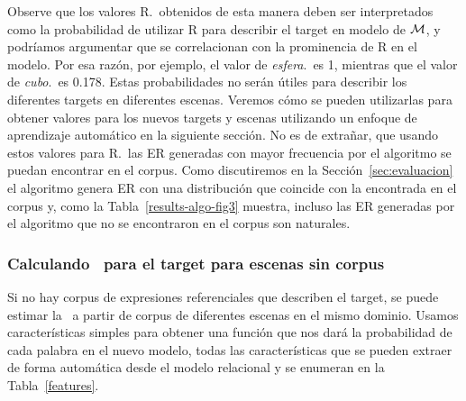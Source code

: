 Observe que los valores R.\puse\ obtenidos de esta manera deben ser
interpretados como la probabilidad de utilizar R para describir el target en
modelo de $\mathcal{M} $, y podr\'{i}amos argumentar que se correlacionan con la
 prominencia de R en el modelo. Por esa raz\'on, por ejemplo, el
valor de \emph{esfera}.\puse\ es 1, mientras que el valor de
\emph{cubo}.\puse\ es 0.178. Estas probabilidades no ser\'an \'utiles
para describir los diferentes targets en diferentes escenas. Veremos c\'omo se
pueden utilizarlas para obtener valores para los nuevos targets y escenas utilizando un
enfoque de aprendizaje autom\'atico en la siguiente secci\'on. No es de extra\~nar,
que usando estos valores para R.\puse\ las ER generadas con mayor frecuencia por el
algoritmo se puedan encontrar en el corpus. Como discutiremos en la Secci\'on~\ref{sec:evaluacion} el algoritmo genera ER
con una distribuci\'on que coincide con la encontrada en el corpus y, como la
Tabla~\ref{results-algo-fig3} muestra, incluso las ER generadas por el algoritmo que no se encontraron
en el corpus son naturales.


\subsubsection{Calculando \puse\ para el target para escenas sin corpus } 
\label{subsec:learning}

%

Si no hay corpus de expresiones referenciales que describen el target, se puede estimar la \puse~a partir de corpus de
diferentes escenas en el mismo dominio.
Usamos caracter\'isticas simples para obtener una funci\'on que nos dar\'a la probabilidad de cada palabra en el nuevo modelo, todas las caracter\'isticas que se pueden extraer de forma autom\'atica desde el modelo relacional y se enumeran en la Tabla~\ref{features}.

